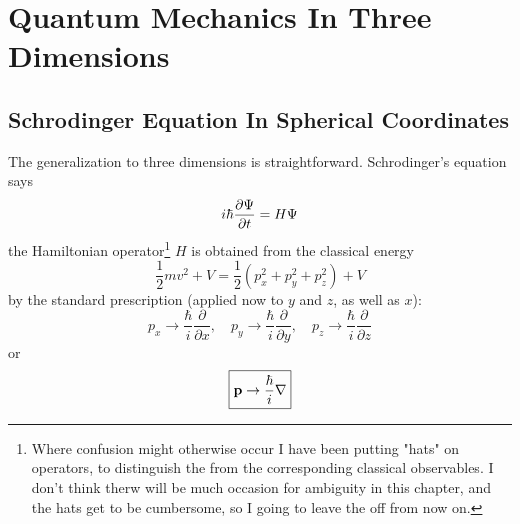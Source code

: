 \chapter{Quantum Mechanics In Three Dimensions}
\section{Schrodinger Equation In Spherical Coordinates}
The generalization to three dimensions is straightforward. Schrodinger's equation says
\begin{equation}\label{4.1}
	i\hbar\pdv{\Psi}{t}=H\Psi
\end{equation}
the Hamiltonian operator\footnote{Where confusion might otherwise occur I have been putting "hats" on operators, to distinguish the from the corresponding classical observables. I don't think therw will be much occasion for ambiguity in this chapter, and the hats get to be cumbersome, so I going to leave the off from now on.} $H$ is obtained from the classical energy $$\frac{1}{2}mv^2+V=\frac{1}{2}(p_x^2+p_y^2+p_z^2)+V$$ by the standard prescription (applied now to $y$ and $z$, as well as $x$):
\begin{equation}\label{4.2}
	p_x\to\frac{\hbar}{i}\frac{\partial}{\partial x},\quad p_y\to\frac{\hbar}{i}\frac{\partial}{\partial y},\quad p_z\to\frac{\hbar}{i}\frac{\partial}{\partial z}
\end{equation}
or
\begin{equation}\label{4.3}
	\boxed{\vb{p}\to\frac{\hbar}{i}\nabla}
\end{equation}

 

 





























